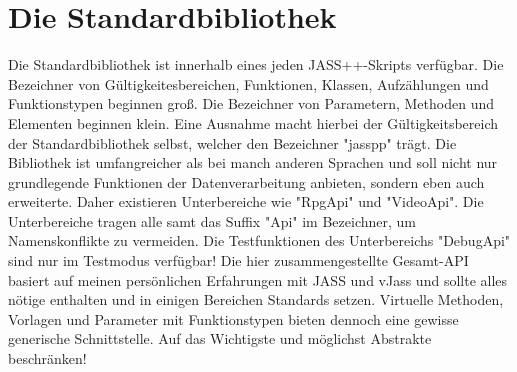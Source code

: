 \chapter{Die Standardbibliothek}
Die Standardbibliothek ist innerhalb eines jeden JASS++-Skripts verfügbar.
Die Bezeichner von Gültigkeitesbereichen, Funktionen, Klassen, Aufzählungen und Funktionstypen beginnen groß. Die Bezeichner von Parametern, Methoden und Elementen
beginnen klein.
Eine Ausnahme macht hierbei der Gültigkeitsbereich der Standardbibliothek selbst, welcher den Bezeichner "jasspp" trägt.
Die Bibliothek ist umfangreicher als bei manch anderen Sprachen und soll nicht nur grundlegende Funktionen der Datenverarbeitung anbieten, sondern eben auch
erweiterte.
Daher existieren Unterbereiche wie "RpgApi" und "VideoApi".
Die Unterbereiche tragen alle samt das Suffix "Api" im Bezeichner, um Namenskonflikte zu vermeiden.
Die Testfunktionen des Unterbereichs "DebugApi" sind nur im Testmodus verfügbar!
Die hier zusammengestellte Gesamt-API basiert auf meinen persönlichen Erfahrungen mit JASS und vJass und sollte alles nötige enthalten und in einigen Bereichen
Standards setzen. Virtuelle Methoden, Vorlagen und Parameter mit Funktionstypen bieten dennoch eine gewisse generische Schnittstelle.
Auf das Wichtigste und möglichst Abstrakte beschränken!

